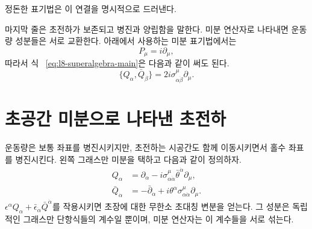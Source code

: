 \begin{classroomqa}
\end{classroomqa}

정돈한 표기법은 이 연결을 명시적으로 드러낸다.

마지막 줄은 초전하가 보존되고 병진과 양립함을 말한다. 미분 연산자로 나타내면 운동량 성분들은 서로 교환한다. 아래에서 사용하는 미분 표기법에서는
\begin{equation}
P_\mu=i\partial_\mu,
\end{equation}
따라서 식 ~\eqref{eq:l8-superalgebra-main}은 다음과 같이 써도 된다.
\begin{equation}
\{Q_\alpha,\bar Q_{\dot\beta}\}
=2i\sigma^\mu_{\alpha\dot\beta}\partial_\mu.
\end{equation}

\section{초공간 미분으로 나타낸 초전하}

운동량은 보통 좌표를 병진시키지만, 초전하는 시공간도 함께 이동시키면서 홀수 좌표를 병진시킨다. 왼쪽 그래스만 미분을 택하고 다음과 같이 정의하자.
\begin{align}
Q_\alpha
&=\partial_\alpha
-i\sigma^\mu_{\alpha\dot\alpha}
\bar\theta^{\dot\alpha}\partial_\mu,
\label{eq:l8-Q}\\
\bar Q_{\dot\alpha}
&=-\bar\partial_{\dot\alpha}
+i\theta^\alpha\sigma^\mu_{\alpha\dot\alpha}\partial_\mu.
\label{eq:l8-Qbar}
\end{align}
\(\epsilon^\alpha Q_\alpha+
\bar\epsilon_{\dot\alpha}\bar Q^{\dot\alpha}\)를 작용시키면 초장에 대한 무한소 초대칭 변분을 얻는다. 그 성분은 독립적인 그래스만 단항식들의 계수일 뿐이며, 미분 연산자는 이 계수들을 서로 섞는다.

\begin{classroomqa}\end{classroomqa}

